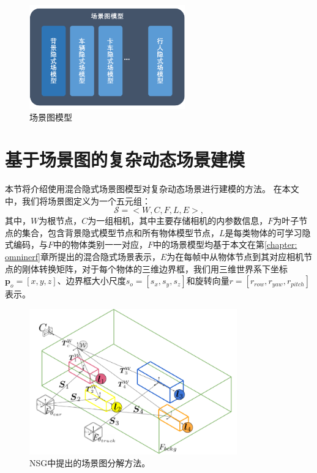 \begin{figure}[ht]
    \centering
    \includegraphics[width=0.6\textwidth]{undergraduate-thesis/images/related-work/scene-graph.pdf}
    \caption{场景图模型}
    \label{fig:scene-graph model}
\end{figure}

\section{基于场景图的复杂动态场景建模}

本节将介绍使用混合隐式场景图模型对复杂动态场景进行建模的方法。 在本文中，我们将场景图定义为一个五元组\cite{ost_neural_2021}：
\begin{equation}
    \mathcal{S} = <W, C, F, L, E>,
\end{equation}
其中，$W$为根节点，$C$为一组相机，其中主要存储相机的内参数信息，$F$为叶子节点的集合，包含背景隐式模型节点和所有物体模型节点，$L$是每类物体的可学习隐式编码，与$F$中的物体类别一一对应，$F$中的场景模型均基于本文在第\ref{chapter: omninerf}章所提出的混合隐式场景表示，$E$为在每帧中从物体节点到其对应相机节点的刚体转换矩阵，对于每个物体的三维边界框，我们用三维世界系下坐标$\mathbf{p}_o = [x, y, z]$、边界框大小尺度$s_o = [s_x, s_y, s_z]$和旋转向量$r = [r_{row}, r_{yaw}, r_{pitch}]$表示。

\begin{figure}[ht]
    \centering
    \includegraphics[width=0.8\textwidth]{undergraduate-thesis/images/related-work/nsg-scene-graph visualization.png}
    \caption{NSG\cite{ost_neural_2021}中提出的场景图分解方法。}
    \label{fig:NSG scene graph}
\end{figure}

